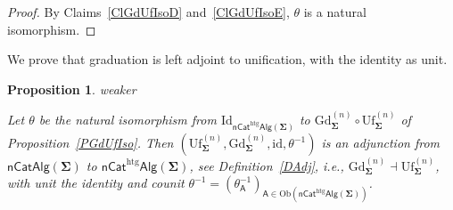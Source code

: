 \documentclass[a4paper, reqno]{amsbook}
\makeatletter
\newcommand{\sig}[1]{\mathbf{#1}}             %
\newcommand{\calg}[1]{\boldsymbol{\mathsf{#1}}} %
\newcommand{\htg}{\mathrm{htg}}                %
\newcommand{\id}{\mathrm{id}}
\newcommand{\Id}{\mathrm{Id}}
\newcommand{\Gd}{\mathrm{Gd}}
\newcommand{\Uf}{\mathrm{Uf}}
\theoremstyle{plain}
\newtheorem{proposition}[theorem]{Proposition}
\theoremstyle{definition}
\newcommand*{\CA@leanpending}{}
\newcommand*{\CA@leanrelation}{}
\newcommand*{\lean}[2]{%
  \ifcsname\string\color@lean@#1\endcsname\else
    \PackageError{main}{Unknown relation `#1' in \string\lean}{Use equivalent, weaker or stronger.}%
  \fi
  \gdef\CA@leanrelation{#1}%
  \gdef\CA@leanpending{#2}}
\makeatother
\begin{document}
\begin{proof}
By Claims~\ref{ClGdUfIsoD} and~\ref{ClGdUfIsoE}, $\theta$ is a natural isomorphism. 
\end{proof}

We prove that graduation is left adjoint to unification, with the identity as unit.

\begin{proposition}\label{PGdUfAdj}\lean{weaker}{Presentations.presentationAdjunction}
Let $\theta$ be the natural isomorphism from $\Id_{\mathsf{nCat}^{\htg}\mathsf{Alg}(\sig{\Sigma})}$ to $\Gd^{(n)}_{\sig{\Sigma}}\circ\Uf^{(n)}_{\sig{\Sigma}}$ of Proposition~\ref{PGdUfIso}.
Then $(\Uf^{(n)}_{\sig{\Sigma}},\Gd^{(n)}_{\sig{\Sigma}},\id,\theta^{-1})$ is an adjunction from $\mathsf{nCatAlg}(\sig{\Sigma})$ to $\mathsf{nCat}^{\htg}\mathsf{Alg}(\sig{\Sigma})$, see Definition~\ref{DAdj}, i.e., $\Gd^{(n)}_{\sig{\Sigma}}\dashv\Uf^{(n)}_{\sig{\Sigma}}$, with unit the identity and counit $\theta^{-1}=(\theta^{-1}_{\calg{A}})_{\calg{A}\in\mathrm{Ob}(\mathsf{nCat}^{\htg}\mathsf{Alg}(\sig{\Sigma}))}$.
\end{proposition}
\end{document}
